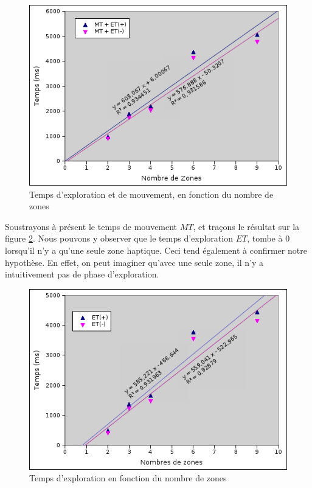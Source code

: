 \documentclass[
]{book}
\begin{document}
\begin{figure}
\centering
\includegraphics{img/exp_explo2.png}
\caption{\label{fig:exploration}Temps d'exploration et de mouvement,
en fonction du nombre de zones}
\end{figure}

Soustrayons à présent le temps de mouvement \(MT\), et traçons le résultat
sur la figure \ref{fig:tefn}. Nous pouvons y observer que le temps
d'exploration \(ET\), tombe à 0 lorsqu'il n'y a
qu'une seule zone haptique. Ceci tend également à confirmer notre hypothèse.
En effet, on peut imaginer qu'avec une seule zone, il n'y a intuitivement pas
de phase d'exploration.

\begin{figure}
\centering
\includegraphics{img/exp_explo3.png}
\caption{\label{fig:tefn}Temps d'exploration en fonction du
nombre de zones}
\end{figure}
\end{document}
